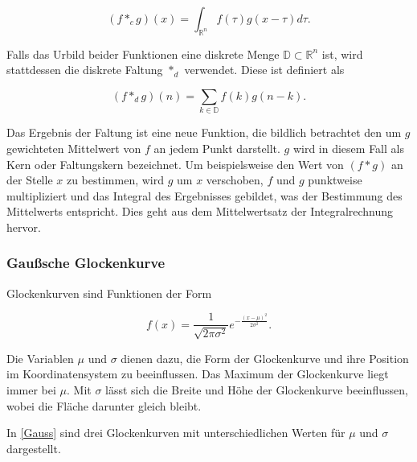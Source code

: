 \documentclass[a4paper,fontsize=12pt,toc=bib,parskip=half,ngerman]{scrartcl}
\begin{document}
\begin{equation}
(f*_cg)(x) = \int_{\mathbb{R}^n} f(\tau)g(x-\tau)d\tau.
\end{equation}

Falls das Urbild beider Funktionen eine diskrete Menge $\mathbb{D} \subset \mathbb{R}^n$ ist, wird stattdessen die diskrete Faltung $*_d$ verwendet. Diese ist definiert als

\begin{equation}
(f*_dg)(n) = \sum_{k\in\mathbb{D}}f(k)g(n-k).
\end{equation}

Das Ergebnis der Faltung ist eine neue Funktion, die bildlich betrachtet den um $g$ gewichteten Mittelwert von $f$ an jedem Punkt darstellt. $g$ wird in diesem Fall als Kern oder Faltungskern bezeichnet. Um beispielsweise den Wert von $(f*g)$ an der Stelle $x$ zu bestimmen, wird $g$ um $x$ verschoben, $f$ und $g$ punktweise multipliziert und das Integral des Ergebnisses gebildet, was der Bestimmung des Mittelwerts entspricht. Dies geht aus dem Mittelwertsatz der Integralrechnung hervor.

\subsubsection{Gau{\ss}sche Glockenkurve}
Glockenkurven sind Funktionen der Form 

\begin{equation}
f(x) = \frac{1}{\sqrt{2\pi \sigma^2}}e^{-\frac{(x-\mu)^2}{2\sigma^2}}.
\end{equation}

Die Variablen $\mu$ und $\sigma$ dienen dazu, die Form der Glockenkurve und ihre Position im Koordinatensystem zu beeinflussen. Das Maximum der Glockenkurve liegt immer bei $\mu$. Mit $\sigma$ l\"asst sich die Breite und H\"ohe der Glockenkurve beeinflussen, wobei die Fl\"ache darunter gleich bleibt.

In \cref{Gauss} sind drei Glockenkurven mit unterschiedlichen Werten f\"ur $\mu$ und $\sigma$ dargestellt.

\end{document}
